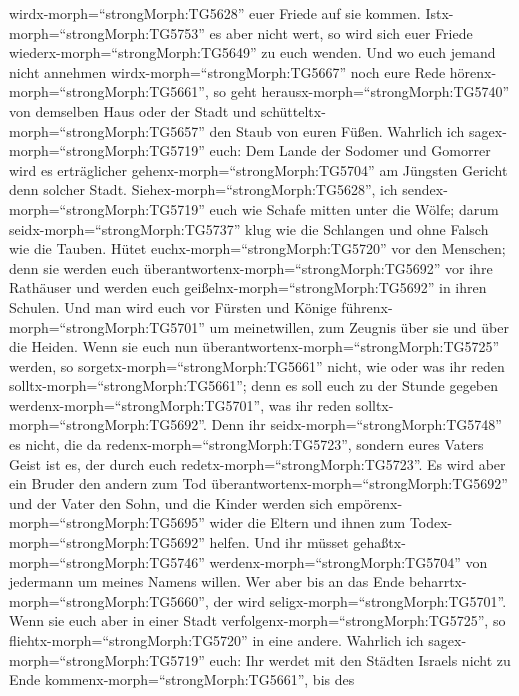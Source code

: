 wirdx-morph=``strongMorph:TG5628'' euer Friede auf sie kommen.
Istx-morph=``strongMorph:TG5753'' es aber nicht wert, so wird sich euer
Friede wiederx-morph=``strongMorph:TG5649'' zu euch wenden.
 Und wo euch jemand nicht annehmen
wirdx-morph=``strongMorph:TG5667'' noch eure Rede
hörenx-morph=``strongMorph:TG5661'', so geht
herausx-morph=``strongMorph:TG5740'' von demselben Haus oder der Stadt
und schütteltx-morph=``strongMorph:TG5657'' den Staub von euren Füßen.
 Wahrlich ich sagex-morph=``strongMorph:TG5719'' euch: Dem
Lande der Sodomer und Gomorrer wird es erträglicher
gehenx-morph=``strongMorph:TG5704'' am Jüngsten Gericht denn solcher
Stadt.  Siehex-morph=``strongMorph:TG5628'', ich
sendex-morph=``strongMorph:TG5719'' euch wie Schafe mitten unter die
Wölfe; darum seidx-morph=``strongMorph:TG5737'' klug wie die Schlangen
und ohne Falsch wie die Tauben.  Hütet
euchx-morph=``strongMorph:TG5720'' vor den Menschen; denn sie werden
euch überantwortenx-morph=``strongMorph:TG5692'' vor ihre Rathäuser und
werden euch geißelnx-morph=``strongMorph:TG5692'' in ihren Schulen.
 Und man wird euch vor Fürsten und Könige
führenx-morph=``strongMorph:TG5701'' um meinetwillen, zum Zeugnis über
sie und über die Heiden.  Wenn sie euch nun
überantwortenx-morph=``strongMorph:TG5725'' werden, so
sorgetx-morph=``strongMorph:TG5661'' nicht, wie oder was ihr reden
solltx-morph=``strongMorph:TG5661''; denn es soll euch zu der Stunde
gegeben werdenx-morph=``strongMorph:TG5701'', was ihr reden
solltx-morph=``strongMorph:TG5692''.  Denn ihr
seidx-morph=``strongMorph:TG5748'' es nicht, die da
redenx-morph=``strongMorph:TG5723'', sondern eures Vaters Geist ist es,
der durch euch redetx-morph=``strongMorph:TG5723''.  Es
wird aber ein Bruder den andern zum Tod
überantwortenx-morph=``strongMorph:TG5692'' und der Vater den Sohn, und
die Kinder werden sich empörenx-morph=``strongMorph:TG5695'' wider die
Eltern und ihnen zum Todex-morph=``strongMorph:TG5692'' helfen.
 Und ihr müsset gehaßtx-morph=``strongMorph:TG5746''
werdenx-morph=``strongMorph:TG5704'' von jedermann um meines Namens
willen. Wer aber bis an das Ende beharrtx-morph=``strongMorph:TG5660'',
der wird seligx-morph=``strongMorph:TG5701''.  Wenn sie
euch aber in einer Stadt verfolgenx-morph=``strongMorph:TG5725'', so
fliehtx-morph=``strongMorph:TG5720'' in eine andere. Wahrlich ich
sagex-morph=``strongMorph:TG5719'' euch: Ihr werdet mit den Städten
Israels nicht zu Ende kommenx-morph=``strongMorph:TG5661'', bis des
